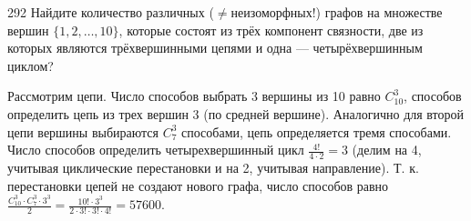 \begin{task}{292}
Найдите количество различных ($\neq$неизоморфных!) графов на множестве вершин $\{1, 2, \ldots, 10\}$, которые состоят из трёх компонент связности, две из которых являются трёхвершинными цепями и одна — четырёхвершинным циклом?
\end{task}
\begin{solution}
Рассмотрим цепи. Число способов выбрать 3 вершины из 10 равно $C_{10}^3$, способов определить цепь из трех вершин 3 (по средней вершине). Аналогично для второй цепи вершины выбираются $C_{7}^3$ способами, цепь определяется тремя способами. Число способов определить четырехвершинный цикл $\frac{4!}{4\cdot2}=3$ (делим на 4, учитывая циклические перестановки и на 2, учитывая направление). Т. к. перестановки цепей не создают нового графа, число способов равно $\frac{C_{10}^3 \cdot C_{7}^3\cdot3^3}{2}=\frac{10!\cdot3^3}{2\cdot3!\cdot3!\cdot4!}=57600$.
\end{solution}